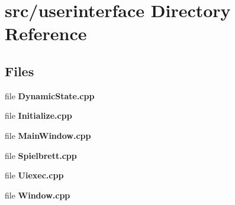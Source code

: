\section{src/userinterface Directory Reference}
\label{dir_6a9bbfda24ff156040a5bbe170f94215}
\subsection*{Files}
\begin{DoxyCompactItemize}
\item 
file {\bfseries Dynamic\-State.\-cpp}
\item 
file {\bfseries Initialize.\-cpp}
\item 
file {\bfseries Main\-Window.\-cpp}
\item 
file {\bfseries Spielbrett.\-cpp}
\item 
file {\bfseries Uiexec.\-cpp}
\item 
file {\bfseries Window.\-cpp}
\end{DoxyCompactItemize}
